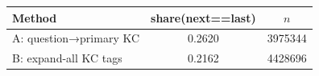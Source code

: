 \begin{tabular}{lcc}
\toprule
Method & share(next==last) & $n$ \\
\midrule
A: question→primary KC & 0.2620 & 3975344 \\
B: expand-all KC tags & 0.2162 & 4428696 \\
\bottomrule
\end{tabular}

